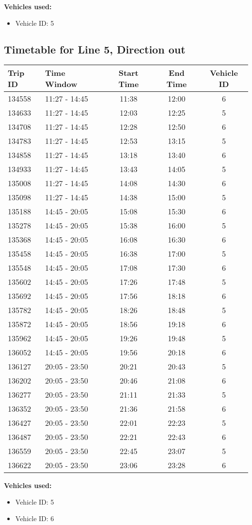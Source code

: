 \documentclass{article}
\begin{document}
\textbf{Vehicles used:}
\begin{itemize}
  \item Vehicle ID: 5
\end{itemize}

\subsection*{Timetable for Line 5, Direction out}
\begin{tabular}{llccc}
\toprule
Trip ID & Time Window & Start Time & End Time & Vehicle ID \\
\midrule
134558 & 11:27 - 14:45 & 11:38 & 12:00 & 6 \\
134633 & 11:27 - 14:45 & 12:03 & 12:25 & 5 \\
134708 & 11:27 - 14:45 & 12:28 & 12:50 & 6 \\
134783 & 11:27 - 14:45 & 12:53 & 13:15 & 5 \\
134858 & 11:27 - 14:45 & 13:18 & 13:40 & 6 \\
134933 & 11:27 - 14:45 & 13:43 & 14:05 & 5 \\
135008 & 11:27 - 14:45 & 14:08 & 14:30 & 6 \\
135098 & 11:27 - 14:45 & 14:38 & 15:00 & 5 \\
135188 & 14:45 - 20:05 & 15:08 & 15:30 & 6 \\
135278 & 14:45 - 20:05 & 15:38 & 16:00 & 5 \\
135368 & 14:45 - 20:05 & 16:08 & 16:30 & 6 \\
135458 & 14:45 - 20:05 & 16:38 & 17:00 & 5 \\
135548 & 14:45 - 20:05 & 17:08 & 17:30 & 6 \\
135602 & 14:45 - 20:05 & 17:26 & 17:48 & 5 \\
135692 & 14:45 - 20:05 & 17:56 & 18:18 & 6 \\
135782 & 14:45 - 20:05 & 18:26 & 18:48 & 5 \\
135872 & 14:45 - 20:05 & 18:56 & 19:18 & 6 \\
135962 & 14:45 - 20:05 & 19:26 & 19:48 & 5 \\
136052 & 14:45 - 20:05 & 19:56 & 20:18 & 6 \\
136127 & 20:05 - 23:50 & 20:21 & 20:43 & 5 \\
136202 & 20:05 - 23:50 & 20:46 & 21:08 & 6 \\
136277 & 20:05 - 23:50 & 21:11 & 21:33 & 5 \\
136352 & 20:05 - 23:50 & 21:36 & 21:58 & 6 \\
136427 & 20:05 - 23:50 & 22:01 & 22:23 & 5 \\
136487 & 20:05 - 23:50 & 22:21 & 22:43 & 6 \\
136559 & 20:05 - 23:50 & 22:45 & 23:07 & 5 \\
136622 & 20:05 - 23:50 & 23:06 & 23:28 & 6 \\
\bottomrule
\end{tabular}

\textbf{Vehicles used:}
\begin{itemize}
  \item Vehicle ID: 5
  \item Vehicle ID: 6
\end{itemize}
\end{document}
